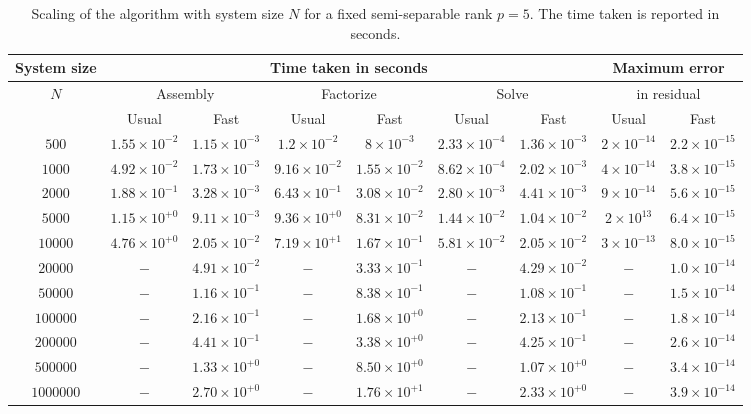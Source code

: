\documentclass[final,leqno]{siamltex}
\begin{document}
\begin{table}[!htbp]
\caption{Scaling of the algorithm with system size $N$ for a fixed semi-separable rank $p=5$. The time taken is reported in seconds.}
\begin{center}
\begin{tabular}{|c|c|c|c|c|c|c|c|c|}
\hline
System size& \multicolumn{6}{c|}{Time taken in seconds} & \multicolumn{2}{c|}{Maximum error}\\
\hline
$N$ & \multicolumn{2}{c|}{Assembly} & \multicolumn{2}{c|}{Factorize} & \multicolumn{2}{c|}{Solve} & \multicolumn{2}{c|}{in residual}\\
\hline
 & Usual & Fast & Usual & Fast & Usual & Fast & Usual & Fast\\
\hline
$500$ & $1.55 \times 10^{-2}$ & $1.15 \times 10^{-3}$ & $1.2 \times 10^{-2}$ & $8\times 10^{-3}$ & $2.33 \times 10^{-4}$ & $1.36 \times 10^{-3}$ & $2 \times 10^{-14}$ & $2.2 \times 10^{-15}$\\
\hline
$1000$ & $4.92 \times 10^{-2}$ & $1.73 \times 10^{-3}$ & $9.16 \times 10^{-2}$ & $1.55 \times 10^{-2}$ & $8.62 \times 10^{-4}$ & $2.02 \times 10^{-3}$ & $4 \times 10^{-14}$ & $3.8 \times 10^{-15}$\\
\hline
$2000$ & $1.88 \times 10^{-1}$ & $3.28 \times 10^{-3}$ & $6.43 \times 10^{-1}$ & $3.08 \times 10^{-2}$ & $2.80 \times 10^{-3}$ & $4.41 \times 10^{-3}$ & $9 \times 10^{-14}$ & $5.6 \times 10^{-15}$\\
\hline
$5000$ & $1.15 \times 10^{+0}$ & $9.11 \times 10^{-3}$ & $9.36 \times 10^{+0}$ & $8.31 \times 10^{-2}$ & $1.44 \times 10^{-2}$ & $1.04 \times 10^{-2}$ & $2 \times 10^{13}$ & $6.4 \times 10^{-15}$\\
\hline
$10000$ & $4.76 \times 10^{+0}$ & $2.05 \times 10^{-2}$ & $7.19 \times 10^{+1}$ & $1.67 \times 10^{-1}$ & $5.81 \times 10^{-2}$ & $2.05 \times 10^{-2}$ & $3 \times 10^{-13}$ & $8.0 \times 10^{-15}$\\
\hline
$20000$ & $-$ & $4.91 \times 10^{-2}$ & $-$ & $3.33 \times 10^{-1}$ & $-$ & $4.29 \times 10^{-2}$ & $-$ & $1.0 \times 10^{-14}$\\
\hline
$50000$ & $-$ & $1.16 \times 10^{-1}$ & $-$ & $8.38 \times 10^{-1}$ & $-$ & $1.08 \times 10^{-1}$ & $-$ & $1.5 \times 10^{-14}$\\
\hline
$100000$ & $-$ & $2.16 \times 10^{-1}$ & $-$ & $1.68 \times 10^{+0}$ & $-$ & $2.13 \times 10^{-1}$ & $-$ & $1.8 \times 10^{-14}$\\
\hline
$200000$ & $-$ & $4.41 \times 10^{-1}$ & $-$ & $3.38 \times 10^{+0}$ & $-$ & $4.25 \times 10^{-1}$ & $-$ & $2.6 \times 10^{-14}$\\
\hline
$500000$ & $-$ & $1.33 \times 10^{+0}$ & $-$ & $8.50 \times 10^{+0}$ & $-$ & $1.07 \times 10^{+0}$ & $-$ & $3.4 \times 10^{-14}$\\
\hline
$1000000$ & $-$ & $2.70 \times 10^{+0}$ & $-$ & $1.76 \times 10^{+1}$ & $-$ & $2.33 \times 10^{+0}$ & $-$ & $3.9 \times 10^{-14}$\\
\hline
\end{tabular}
\end{center}
\label{table_N_scaling}
\end{table}
\end{document}
